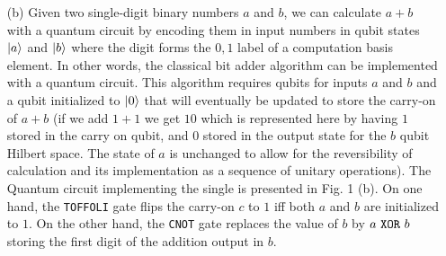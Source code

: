 \documentclass[10pt, a4paper]{article}
\begin{document}
{\begin{enumerate}
  \item[(b)] Given two single-digit binary numbers $a$ and $b$, we can calculate $a+b$ with a quantum circuit by encoding them in input numbers in qubit states $\ket{a}$ and $\ket{b}$ where the digit forms the $0, 1$ label of a computation basis element. In other words, the classical bit adder algorithm can be implemented with a quantum circuit. This algorithm requires qubits for inputs $a$ and $b$ and a qubit initialized to $\ket{0}$ that will eventually be updated to store the carry-on of $a+b$ (if we add $1 + 1$ we get $10$ which is represented here by having $1$ stored in the carry on qubit, and $0$ stored in the output state for the $b$ qubit Hilbert space. The state of $a$ is unchanged to allow for the reversibility of calculation and its implementation as a sequence of unitary operations).  The Quantum circuit implementing the single is presented in Fig. 1 (b). On one hand, the \verb|TOFFOLI| gate flips the carry-on $c$ to $1$ iff both $a$ and $b$ are initialized to $1$. On the other hand, the \verb|CNOT| gate replaces the value of $b$ by $a \ \verb|XOR|\ b$ storing the first digit of the addition output in $b$. 


\end{enumerate}}
\end{document}
